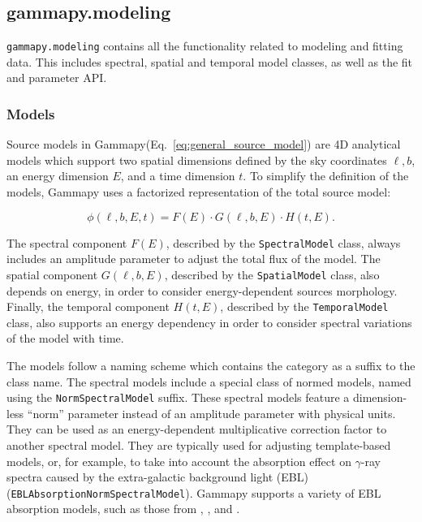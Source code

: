 \documentclass[longauth]{aa}
\newcommand{\code}[1]{\texttt{#1}}
\newcommand{\gammapy}{Gammapy\xspace}
\newcommand{\gammaray}{$\gamma$-ray\xspace}
\begin{document}
\subsection{gammapy.modeling}
\label{ssec:gammapy-modeling}
%
\code{gammapy.modeling} contains all the functionality related to modeling and fitting
data. This includes spectral, spatial and temporal model classes, as well as
the fit and parameter API.

\subsubsection{Models}
\label{sssec:models}
Source models in \gammapy (Eq.~\ref{eq:general_source_model}) are 4D 
analytical models which support two spatial dimensions defined by the sky coordinates
$\ell, b$, an energy dimension $E$, and a time dimension $t$. To simplify the definition of the
models, \gammapy uses a factorized representation of the total source
model:

\begin{equation}
    \phi(\ell, b, E, t) = F(E) \cdot G(\ell, b, E) \cdot H(t, E).
    \label{eq:source_model_dependency}
\end{equation}

The spectral component $F(E)$, described by the \code{SpectralModel} class, always
includes an amplitude parameter to adjust the total flux of the model.
The spatial component $G(\ell, b, E)$, described by the \code{SpatialModel} class,
also depends on energy, in order to consider energy-dependent sources morphology.
Finally, the temporal component $H(t, E)$, described by the \code{TemporalModel}
class, also supports an energy dependency in order to consider spectral variations
of the model with time.

The models follow a naming scheme which contains the category as a suffix to
the class name. The spectral models include a special class of normed models,
named using the \code{NormSpectralModel} suffix.
These spectral models feature a dimension-less \enquote{norm} parameter
instead of an amplitude parameter with physical units. They
can be used as an energy-dependent multiplicative correction
factor to another spectral model. They are typically used for
adjusting template-based models, or, for example, to take into account
the absorption effect on \gammaray spectra caused by the extra-galactic background
light (EBL) (\code{EBLAbsorptionNormSpectralModel}). \gammapy supports a variety
of EBL absorption models, such as those from \cite{Franceschini2008, Franceschini2017}, \cite{Finke2010},
and \cite{Dominguez2011}.
\end{document}
